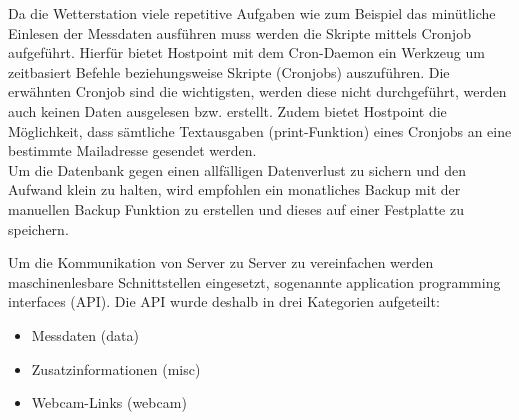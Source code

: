 \documentclass[11pt]{article}
\begin{document}
\begin{multicols}{2}
Da die Wetterstation viele repetitive Aufgaben wie zum Beispiel das minütliche Einlesen der Messdaten ausführen muss werden die Skripte mittels Cronjob aufgeführt. Hierfür  bietet Hostpoint mit dem Cron-Daemon ein Werkzeug um zeitbasiert Befehle beziehungsweise Skripte (Cronjobs) auszuführen. Die erwähnten Cronjob sind die wichtigsten, werden diese nicht durchgeführt, werden auch keinen Daten ausgelesen bzw. erstellt. Zudem bietet Hostpoint die Möglichkeit, dass sämtliche Textausgaben (print-Funktion) eines Cronjobs an eine bestimmte Mailadresse gesendet werden.\\
Um die Datenbank gegen einen allfälligen Datenverlust zu sichern und den Aufwand klein zu halten, wird empfohlen ein monatliches Backup mit der manuellen Backup Funktion zu erstellen und dieses auf einer Festplatte zu speichern. 



Um die Kommunikation von Server zu Server zu vereinfachen werden maschinenlesbare Schnittstellen eingesetzt, sogenannte application programming interfaces (API). Die API wurde deshalb in drei Kategorien aufgeteilt:

\begin{itemize}
\item Messdaten (data)
\item Zusatzinformationen (misc)
\item Webcam-Links (webcam)
\end{itemize}


\end{multicols}
\end{document}
